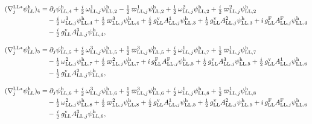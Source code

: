 \documentclass[
  10pt,
]{article}
\begin{document}
\[\begin{aligned}
(\nabla^{{\rm LL}*}_j\psi^{\rm h}_{\rm LL})_4&=\partial_j\psi^{\rm h}_{{\rm LL},4}+\tfrac{i}{2}\,\omega^{1}_{{\rm LL},j}\psi^{\rm h}_{{\rm LL},2}-\tfrac{1}{2}\,\varpi^{1}_{{\rm LL},j}\psi^{\rm h}_{{\rm LL},2}+\tfrac{1}{2}\,\omega^{2}_{{\rm LL},j}\psi^{\rm h}_{{\rm LL},2}+\tfrac{i}{2}\,\varpi^{2}_{{\rm LL},j}\psi^{\rm h}_{{\rm LL},2}\\
&\quad -\tfrac{i}{2}\,\omega^{3}_{{\rm LL},j}\psi^{\rm h}_{{\rm LL},4}+\tfrac{1}{2}\,\varpi^{3}_{{\rm LL},j}\psi^{\rm h}_{{\rm LL},4}+\tfrac{i}{2}\,g^{\rm v}_{\rm LL}A^{1}_{{\rm LL},j}\psi^{\rm h}_{{\rm LL},3}+\tfrac{1}{2}\,g^{\rm v}_{\rm LL}A^{2}_{{\rm LL},j}\psi^{\rm h}_{{\rm LL},3}+i\,g^{\rm F}_{\rm LL}A^{\rm F}_{{\rm LL},j}\psi^{\rm h}_{{\rm LL},4}\\
&\quad -\tfrac{i}{2}\,g^{\rm v}_{\rm LL}A^{3}_{{\rm LL},j}\psi^{\rm h}_{{\rm LL},4},
\end{aligned}\]

\[\begin{aligned}
(\nabla^{{\rm LL}*}_j\psi^{\rm h}_{\rm LL})_5&=\partial_j\psi^{\rm h}_{{\rm LL},5}+\tfrac{i}{2}\,\omega^{3}_{{\rm LL},j}\psi^{\rm h}_{{\rm LL},5}+\tfrac{1}{2}\,\varpi^{3}_{{\rm LL},j}\psi^{\rm h}_{{\rm LL},5}+\tfrac{i}{2}\,\omega^{1}_{{\rm LL},j}\psi^{\rm h}_{{\rm LL},7}+\tfrac{1}{2}\,\varpi^{1}_{{\rm LL},j}\psi^{\rm h}_{{\rm LL},7}\\
&\quad -\tfrac{1}{2}\,\omega^{2}_{{\rm LL},j}\psi^{\rm h}_{{\rm LL},7}+\tfrac{i}{2}\,\varpi^{2}_{{\rm LL},j}\psi^{\rm h}_{{\rm LL},7}+i\,g^{\rm F}_{\rm LL}A^{\rm F}_{{\rm LL},j}\psi^{\rm h}_{{\rm LL},5}+\tfrac{i}{2}\,g^{\rm v}_{\rm LL}A^{3}_{{\rm LL},j}\psi^{\rm h}_{{\rm LL},5}+\tfrac{i}{2}\,g^{\rm v}_{\rm LL}A^{1}_{{\rm LL},j}\psi^{\rm h}_{{\rm LL},6}\\
&\quad -\tfrac{1}{2}\,g^{\rm v}_{\rm LL}A^{2}_{{\rm LL},j}\psi^{\rm h}_{{\rm LL},6},
\end{aligned}\]

\[\begin{aligned}
(\nabla^{{\rm LL}*}_j\psi^{\rm h}_{\rm LL})_6&=\partial_j\psi^{\rm h}_{{\rm LL},6}+\tfrac{i}{2}\,\omega^{3}_{{\rm LL},j}\psi^{\rm h}_{{\rm LL},6}+\tfrac{1}{2}\,\varpi^{3}_{{\rm LL},j}\psi^{\rm h}_{{\rm LL},6}+\tfrac{i}{2}\,\omega^{1}_{{\rm LL},j}\psi^{\rm h}_{{\rm LL},8}+\tfrac{1}{2}\,\varpi^{1}_{{\rm LL},j}\psi^{\rm h}_{{\rm LL},8}\\
&\quad -\tfrac{1}{2}\,\omega^{2}_{{\rm LL},j}\psi^{\rm h}_{{\rm LL},8}+\tfrac{i}{2}\,\varpi^{2}_{{\rm LL},j}\psi^{\rm h}_{{\rm LL},8}+\tfrac{i}{2}\,g^{\rm v}_{\rm LL}A^{1}_{{\rm LL},j}\psi^{\rm h}_{{\rm LL},5}+\tfrac{1}{2}\,g^{\rm v}_{\rm LL}A^{2}_{{\rm LL},j}\psi^{\rm h}_{{\rm LL},5}+i\,g^{\rm F}_{\rm LL}A^{\rm F}_{{\rm LL},j}\psi^{\rm h}_{{\rm LL},6}\\
&\quad -\tfrac{i}{2}\,g^{\rm v}_{\rm LL}A^{3}_{{\rm LL},j}\psi^{\rm h}_{{\rm LL},6},
\end{aligned}\]
\end{document}
